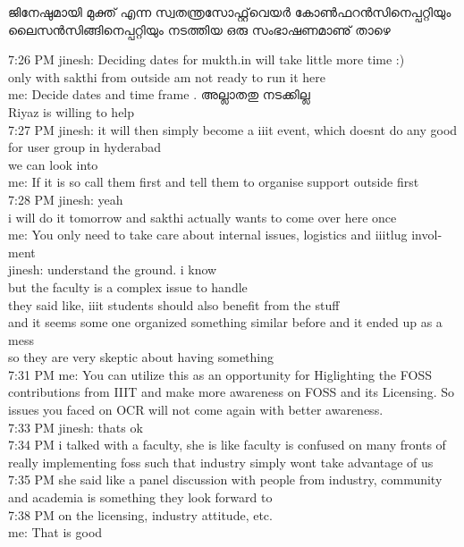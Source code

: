ജിനേഷുമായി മുക്ത് എന്ന സ്വതന്ത്രസോഫ്റ്റ്‌വെയര്‍ കോണ്‍ഫറന്‍സിനെപ്പറ്റിയും ലൈസന്‍സിങ്ങിനെപ്പറ്റിയും നടത്തിയ ഒരു സംഭാഷണമാണു് താഴെ 

\begin{english}
7:26 PM jinesh: Deciding dates for mukth.in will take little more time :) \\
  only with sakthi from outside am not ready to run it here\\
 me: Decide dates and time frame . അല്ലാതതു നടക്കില്ല \\
  Riyaz is willing to help\\
7:27 PM jinesh: it will then simply become a iiit event, which doesnt do any good for user group in hyderabad\\
  we can look into\\
 me: If it is so call them first and tell them to organise support outside first\\
7:28 PM jinesh: yeah\\
  i will do it tomorrow and sakthi actually wants to come over here once\\
 me: You only need to take care about internal issues, logistics and iiitlug involment\\
 jinesh: understand the ground.   i know\\
  but the faculty is a complex issue to handle\\
  they said like, iiit students should also benefit from the stuff\\
  and it seems some one organized something similar before and it ended up as a mess\\
  so they are very skeptic about having something\\
7:31 PM me: You can utilize this as an opportunity for Higlighting the FOSS contributions from IIIT and make more awareness on FOSS  and its Licensing. So issues you faced on OCR will not come again with better awareness. \\
7:33 PM jinesh: thats ok\\
7:34 PM i talked with a faculty, she is like faculty is confused on many fronts of really implementing foss such that industry simply wont take advantage of us\\
7:35 PM she said like a panel discussion with people from industry, community and academia is something they look forward to\\
7:38 PM on the licensing, industry attitude, etc.\\
 me: That is good\\

\end{english}
